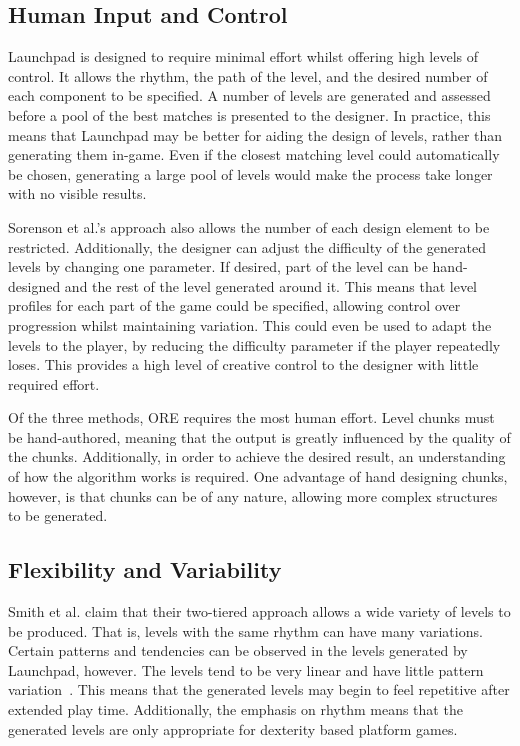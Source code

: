 \documentclass{scrartcl}
\begin{document}
\subsection{Human Input and Control}
Launchpad is designed to require minimal effort whilst offering high levels of control. It allows the rhythm, the path of the level, and the desired number of each component to be specified. A number of levels are generated and assessed before a pool of the best matches is presented to the designer. In practice, this means that Launchpad may be better for aiding the design of levels, rather than generating them in-game. Even if the closest matching level could automatically be chosen, generating a large pool of levels would make the process take longer with no visible results.

Sorenson et al.'s approach also allows the number of each design element to be restricted. Additionally, the designer can adjust the difficulty of the generated levels by changing one parameter. If desired, part of the level can be hand-designed and the rest of the level generated around it. This means that level profiles for each part of the game could be specified, allowing control over progression whilst maintaining variation. This could even be used to adapt the levels to the player, by reducing the difficulty parameter if the player repeatedly loses. This provides a high level of creative control to the designer with little required effort.

Of the three methods, ORE requires the most human effort. Level chunks must be hand-authored, meaning that the output is greatly influenced by the quality of the chunks. Additionally, in order to achieve the desired result, an understanding of how the algorithm works is required. One advantage of hand designing chunks, however, is that chunks can be of any nature, allowing more complex structures to be generated.


\subsection{Flexibility and Variability}
Smith et al. claim that their two-tiered approach allows a wide variety of levels to be produced. That is, levels with the same rhythm can have many variations. Certain patterns and tendencies can be observed in the levels generated by Launchpad, however. The levels tend to be very linear and have little pattern variation~\cite{horn:comparative}. This means that the generated levels may begin to feel repetitive after extended play time. Additionally, the emphasis on rhythm means that the generated levels are only appropriate for dexterity based platform games.
\end{document}
